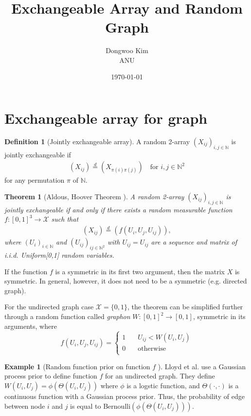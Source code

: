 \documentclass{article}
\title{Exchangeable Array and Random Graph}
\date{\today}
\author{Dongwoo Kim\\ANU}
\newtheorem{theorem}{Theorem} %
\theoremstyle{definition}
\newtheorem{definition}{Definition}
\newtheorem{example}{Example}[definition]
\begin{document}
\maketitle

\section{Exchangeable array for graph}
\begin{definition}[Jointly exchangeable array] A random 2-array $(X_{ij})_{i,j\in \mathbb{N}}$
is jointly exchangeable if
\begin{align}
(X_{ij}) \stackrel{d}{=} (X_{\pi(i)\pi(j)}) \quad \text{for } i,j \in \mathbb{N}^2
\end{align}
for any permutation $\pi$ of $\mathbb{N}$.
\end{definition}

\begin{theorem}[\label{aldous_hoover}Aldous, Hoover Theorem \cite{aldous1981representations,hoover1979relations}] A random 2-array $(X_{ij})_{i,j\in \mathbb{N}}$
is jointly exchangeable if and only if there exists a random measurable function $f:[0,1]^3 \rightarrow \mathcal{X}$ such that
\begin{align}
(X_{ij}) \stackrel{d}{=} (f(U_i, U_j, U_{ij})),
\end{align}
where $(U_{i})_{i \in \mathbb{N}}$ and $(U_{ij})_{ij\in\mathbb{N}^2}$ with $U_{ij} = U_{ij}$ are a sequence and matrix of i.i.d. Uniform[0,1] random variables.
\end{theorem}
If the function $f$ is a symmetric in its first two argument, then the matrix $X$ is symmetric. In general, however, it does not need to be a symmetric (e.g. directed graph).

For the undirected graph case $\mathcal{X} = \{0,1\}$, the theorem can be simplified further through a random function called \textit{graphon} $W:[0,1]^2 \rightarrow [0,1]$, symmetric in its arguments, where
\[ f(U_i, U_j, U_{ij}) = 
  \begin{cases}
    1       & \quad U_{ij} < W(U_i, U_j)\\
    0  & \quad \mathrm{otherwise}\\
  \end{cases}
\]

\begin{example}[Random function prior on function $f$ \cite{Lloyd2013}] Lloyd et al. use a Gaussian process prior to define function $f$ for an undirected graph. They define $W(U_i, U_j) = \phi(\Theta(U_i,U_j))$ where $\phi$ is a logstic function, and $\Theta(\cdot, \cdot)$ is a continuous function with a Gaussian process prior. Thus, the probability of edge between node $i$ and $j$ is equal to Bernoulli$(\phi(\Theta(U_i,U_j)))$.
\end{example}
\end{document}
